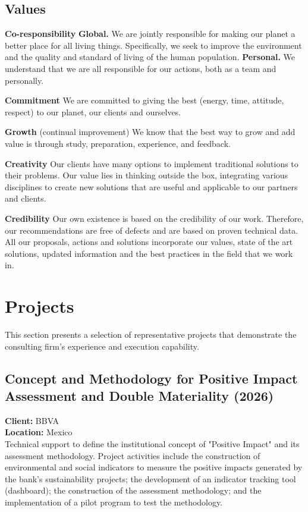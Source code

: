\documentclass[
	a4paper,
	12pt,
	unnumberedsections,
]{CSSullivanBusinessReport}
\begin{document}
\subsection{Values}
\textbf{Co-responsibility}  
\textbf{Global.} We are jointly responsible for making our planet a better place for all living things. Specifically, we seek to improve the environment and the quality and standard of living of the human population.  
\textbf{Personal.} We understand that we are all responsible for our actions, both as a team and personally.

\textbf{Commitment}  
We are committed to giving the best (energy, time, attitude, respect) to our planet, our clients and ourselves.

\textbf{Growth} (continual improvement)  
We know that the best way to grow and add value is through study, preparation, experience, and feedback.

\textbf{Creativity}  
Our clients have many options to implement traditional solutions to their problems. Our value lies in thinking outside the box, integrating various disciplines to create new solutions that are useful and applicable to our partners and clients.

\textbf{Credibility}  
Our own existence is based on the credibility of our work. Therefore, our recommendations are free of defects and are based on proven technical data. All our proposals, actions and solutions incorporate our values, state of the art solutions, updated information and the best practices in the field that we work in.

\section{Projects}

This section presents a selection of representative projects that demonstrate the consulting firm’s experience and execution capability.

\subsection{Concept and Methodology for Positive Impact Assessment and Double Materiality (2026)}
\textbf{Client:} BBVA\\
\textbf{Location:} Mexico\\[0.5em]
Technical support to define the institutional concept of "Positive Impact" and its assessment methodology. Project activities include the construction of environmental and social indicators to measure the positive impacts generated by the bank's sustainability projects; the development of an indicator tracking tool (dashboard); the construction of the assessment methodology; and the implementation of a pilot program to test the methodology.
\end{document}
